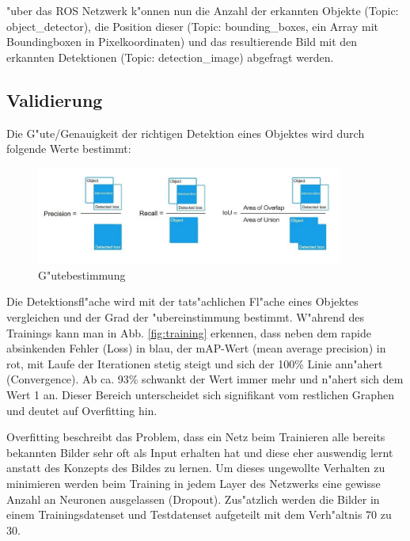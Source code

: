 "uber das ROS Netzwerk k"onnen nun die Anzahl der erkannten Objekte (Topic: object\_detector), die Position dieser (Topic: bounding\_boxes, ein Array mit Boundingboxen in Pixelkoordinaten) und das resultierende Bild mit den erkannten Detektionen (Topic: detection\_image) abgefragt werden.

\subsection{Validierung}
Die G"ute/Genauigkeit der richtigen Detektion eines Objektes wird durch folgende Werte bestimmt:

\begin{figure}[h]
	\centering
	\includegraphics[width=0.9\textwidth]{images/genauigkeit}
	\caption{G"utebestimmung}
	\label{fig:genauigkeit}
\end{figure}

Die Detektionsfl"ache wird mit der tats"achlichen Fl"ache eines Objektes vergleichen und der Grad der "ubereinstimmung bestimmt. W"ahrend des Trainings kann man in Abb. \ref{fig:training} erkennen, dass neben dem rapide absinkenden Fehler (Loss) in blau, der mAP-Wert (mean average precision) in rot, mit Laufe der Iterationen stetig steigt und sich der 100\% Linie ann"ahert (Convergence). Ab ca. 93\% schwankt der Wert immer mehr und n"ahert sich dem Wert 1 an. Dieser Bereich unterscheidet sich signifikant vom restlichen Graphen und deutet auf Overfitting hin.

Overfitting beschreibt das Problem, dass ein Netz beim Trainieren alle bereits bekannten Bilder sehr oft als Input erhalten hat und diese eher auswendig lernt anstatt des Konzepts des Bildes zu lernen. Um dieses ungewollte Verhalten zu minimieren werden beim Training in jedem Layer des Netzwerks eine gewisse Anzahl an Neuronen ausgelassen (Dropout). Zus"atzlich werden die Bilder in einem Trainingsdatenset und Testdatenset aufgeteilt mit dem Verh"altnis 70 zu 30.

